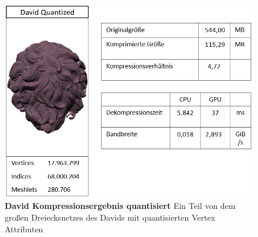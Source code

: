 \begin{figure}[htb]
  \centering  
  \includegraphics[scale=0.75]{Bilder/ergebnisse/david_q.png}
  \caption[David Kompressionsergebnis quantisiert]{\textbf{David Kompressionsergebnis quantisiert} Ein Teil von dem großen Dreiecksnetzes des Davids mit quantisierten Vertex Attributen }
  \label{fig:david_ergebnis}
\end{figure}
